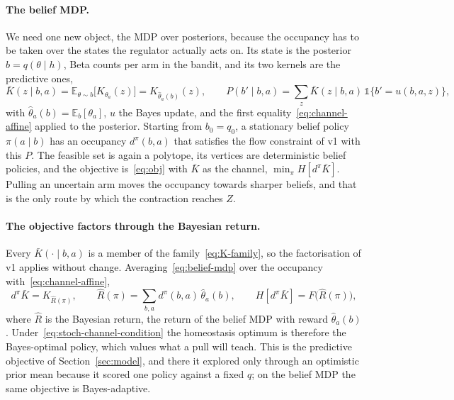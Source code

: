\documentclass[11pt]{article}
\theoremstyle{remark}
\newcommand{\E}{\mathbb E}
\newcommand{\1}{\mathds{1}}
\newcommand{\occ}{d^{\pi}}
\newcommand{\Hf}[1]{H\!\left[#1\right]}
\begin{document}
\paragraph{The belief MDP.}
We need one new object, the MDP over posteriors, because the occupancy has to be taken over the states the regulator actually acts on.
Its state is the posterior $b=q(\theta\mid h)$, Beta counts per arm in the bandit, and its two kernels are the predictive ones,
\begin{equation}
  \bar K(z\mid b,a)=\E_{\theta\sim b}\big[K_{\theta_a}(z)\big]=K_{\hat\theta_a(b)}(z),
  \qquad
  P(b'\mid b,a)=\sum_z\bar K(z\mid b,a)\,\1\big\{b'=u(b,a,z)\big\},
  \label{eq:belief-mdp}
\end{equation}
with $\hat\theta_a(b)=\E_b[\theta_a]$, $u$ the Bayes update, and the first equality~\eqref{eq:channel-affine} applied to the posterior.
Starting from $b_0=q_0$, a stationary belief policy $\pi(a\mid b)$ has an occupancy $\occ(b,a)$ that satisfies the flow constraint of v1 with this $P$.
The feasible set is again a polytope, its vertices are deterministic belief policies, and the objective is~\eqref{eq:obj} with $\bar K$ as the channel, $\min_\pi\Hf{\occ\bar K}$.
Pulling an uncertain arm moves the occupancy towards sharper beliefs, and that is the only route by which the contraction reaches $Z$.

\paragraph{The objective factors through the Bayesian return.}
Every $\bar K(\cdot\mid b,a)$ is a member of the family~\eqref{eq:K-family}, so the factorisation of v1 applies without change.
Averaging~\eqref{eq:belief-mdp} over the occupancy with~\eqref{eq:channel-affine},
\begin{equation}
  \occ\bar K=K_{\hat R(\pi)},
  \qquad
  \hat R(\pi)=\sum_{b,a}\occ(b,a)\,\hat\theta_a(b),
  \qquad
  \Hf{\occ\bar K}=F\big(\hat R(\pi)\big),
  \label{eq:belief-factor}
\end{equation}
where $\hat R$ is the Bayesian return, the return of the belief MDP with reward $\hat\theta_a(b)$.
Under~\eqref{eq:stoch-channel-condition} the homeostasis optimum is therefore the Bayes-optimal policy, which values what a pull will teach.
This is the predictive objective of Section~\ref{sec:model}, and there it explored only through an optimistic prior mean because it scored one policy against a fixed $q$; on the belief MDP the same objective is Bayes-adaptive.
\end{document}
